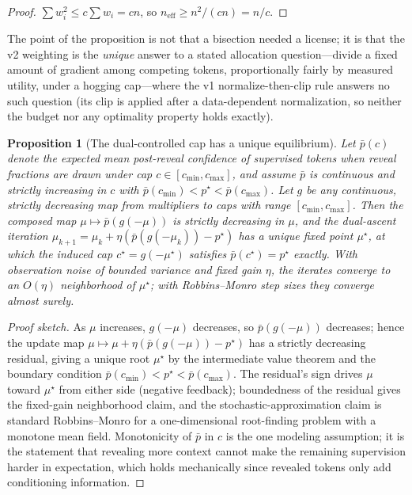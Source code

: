 \documentclass{article} %
\newtheorem{proposition}{Proposition}
\begin{document}
\begin{proof}
$\sum w_i^2 \le c \sum w_i = cn$, so $n_{\mathrm{eff}} \ge n^2 / (cn) = n/c$.
\end{proof}

The point of the proposition is not that a bisection needed a license; it is that the v2 weighting is the \emph{unique} answer to a stated allocation question---divide a fixed amount of gradient among competing tokens, proportionally fairly by measured utility, under a hogging cap---where the v1 normalize-then-clip rule answers no such question (its clip is applied after a data-dependent normalization, so neither the budget nor any optimality property holds exactly).

\begin{proposition}[The dual-controlled cap has a unique equilibrium]
\label{prop:dual}
Let $\bar p(c)$ denote the expected mean post-reveal confidence of supervised tokens when reveal fractions are drawn under cap $c \in [c_{\min}, c_{\max}]$, and assume $\bar p$ is continuous and strictly increasing in $c$ with $\bar p(c_{\min}) < p^\star < \bar p(c_{\max})$. Let $g$ be any continuous, strictly decreasing map from multipliers to caps with range $[c_{\min}, c_{\max}]$. Then the composed map $\mu \mapsto \bar p(g(-\mu))$ is strictly decreasing in $\mu$, and the dual-ascent iteration $\mu_{k+1} = \mu_k + \eta(\bar p(g(-\mu_k)) - p^\star)$ has a unique fixed point $\mu^\star$, at which the induced cap $c^\star = g(-\mu^\star)$ satisfies $\bar p(c^\star) = p^\star$ exactly. With observation noise of bounded variance and fixed gain $\eta$, the iterates converge to an $O(\eta)$ neighborhood of $\mu^\star$; with Robbins--Monro step sizes they converge almost surely.
\end{proposition}

\begin{proof}[Proof sketch]
As $\mu$ increases, $g(-\mu)$ decreases, so $\bar p(g(-\mu))$ decreases; hence the update map $\mu \mapsto \mu + \eta(\bar p(g(-\mu)) - p^\star)$ has a strictly decreasing residual, giving a unique root $\mu^\star$ by the intermediate value theorem and the boundary condition $\bar p(c_{\min}) < p^\star < \bar p(c_{\max})$. The residual's sign drives $\mu$ toward $\mu^\star$ from either side (negative feedback); boundedness of the residual gives the fixed-gain neighborhood claim, and the stochastic-approximation claim is standard Robbins--Monro for a one-dimensional root-finding problem with a monotone mean field. Monotonicity of $\bar p$ in $c$ is the one modeling assumption; it is the statement that revealing more context cannot make the remaining supervision harder in expectation, which holds mechanically since revealed tokens only add conditioning information.
\end{proof}
\end{document}
